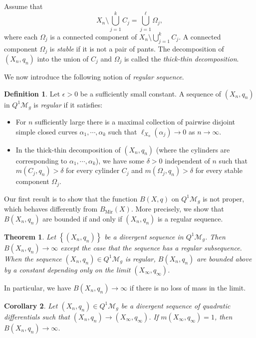 \documentclass{amsart}
\theoremstyle{plain}
\newtheorem{theorem}{Theorem}[section]
\newtheorem{corollary}[theorem]{Corollary}
\theoremstyle{definition}
\newtheorem{definition}{Definition}
\numberwithin{equation}{section}
\newcommand{\Mir}{B_{\operatorname{Mir}}}
\begin{document}
Assume that
$$X_n \setminus \bigcup_{j=1}^k C_j = \bigcup_{j=1}^\ell \Omega_j,$$
where each $\Omega_j$ is a connected component of $X_n \setminus \bigcup_{j=1}^k C_j $. A connected component $\Omega_j$ is \emph{stable} if it is not a pair of pants.
The decomposition of $(X_n,q_n)$ into the union of $C_j$ and $\Omega_j$
is called the \emph{thick-thin decomposition}. 


We now introduce the following notion of \emph{regular sequence}. 
\begin{definition}
Let $\epsilon>0$ be a sufficiently small constant. 
A sequence of $(X_n,q_n)$ in $Q^1\mathcal{M}_{g}$ is \emph{regular} if 
it satisfies: 
\begin{itemize}
  \item For $n$ sufficiently large there is a maximal collection of pairwise disjoint simple closed curves $\alpha_1, \cdots, \alpha_k$ such that $\ell_{X_n}(\alpha_j) \to 0 $ as $n\to\infty$. 
  \item  In the thick-thin decomposition of $(X_n,q_n)$ (where the cylinders are corresponding to $\alpha_1, \cdots, \alpha_k$), we have 
some $\delta>0$ independent of $n$ such that $m(C_j, q_n)>\delta$ for every cylinder $C_j$ and 
 $m(\Omega_j, q_n)>\delta$ 
 for every stable component $\Omega_j$.
\end{itemize}

 
\end{definition}

Our first result is to show that the function $B(X,q)$ on $Q^1\mathcal{M}_{g}$
is not proper, which
behaves differently from $\Mir(X)$. 
More precisely, we show that 
 $B(X_n,q_n)$ are bounded if and only if $(X_n, q_n)$ is a regular sequence. 

\begin{theorem}\label{thm:limit}
Let $\left\{(X_n,q_n)\right\}$ be a divergent sequence  in  $Q^1\mathcal{M}_{g}$.
 Then $B(X_n, q_n) \to \infty$  except the case that the sequence has a regular subsequence. 
 When the sequence $(X_n,q_n)\in Q^1\mathcal{M}_{g}$ is regular, $B(X_n, q_n)$  are  bounded above by a constant depending only on the limit $(X_\infty, q_\infty)$.
\end{theorem} 

 In particular, we have  $B(X_n, q_n) \to \infty$ if there is no loss of mass in the limit. 

\begin{corollary}\label{thm:unit}
Let $(X_n,q_n)\in Q^1\mathcal{M}_{g}$ be  a divergent sequence of quadratic differentials  such that $(X_n, q_n) \to (X_\infty, q_\infty)$.
If $m(X_\infty, q_\infty)=1$, then $B(X_n, q_n) \to \infty$.
\end{corollary}
\end{document}
